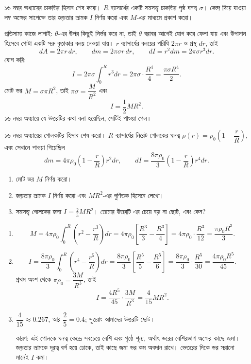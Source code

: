 \documentclass[11pt]{article}
\begin{document}
 ১৬ নম্বর অধ্যায়ের চাকতির হিসাব শেষ করো। $R$ ব্যাসার্ধের একটি
সমসত্ত্ব চাকতির পৃষ্ঠ ঘনত্ব $\sigma$। কেন্দ্র দিয়ে যাওয়া লম্ব অক্ষের সাপেক্ষে
তার জড়তার ভ্রামক $I$ নির্ণয় করো এবং $M$-এর মাধ্যমে প্রকাশ করো।

\begin{sol}
প্রতিসাম্য কাজে লাগাই: $\theta$-এর উপর কিছুই নির্ভর করে না, তাই $\theta$
বরাবর আগেই যোগ করে ফেলা যায় এবং উপাদান হিসেবে গোটা একটি সরু বৃত্তাকার বলয়
নেওয়া যায়। $r$ ব্যাসার্ধের বলয়ের পরিধি $2\pi r$ ও প্রস্থ $dr$, তাই
\[
  dA = 2\pi r\,dr, \qquad dm = 2\pi\sigma r\,dr, \qquad
  dI = r^{2}dm = 2\pi\sigma r^{3}dr .
\]
যোগ করি:
\[
  I = 2\pi\sigma\int_{0}^{R}r^{3}dr = 2\pi\sigma \cdot \frac{R^{4}}{4}
    = \frac{\pi\sigma R^{4}}{2} .
\]
মোট ভর $M = \sigma \pi R^{2}$, তাই $\pi\sigma = \dfrac{M}{R^{2}}$ এবং
\[
  I = \frac{1}{2}MR^{2} .
\]
১৬ নম্বর অধ্যায়ে যে উত্তরটির কথা বলা হয়েছিল, সেটিই পাওয়া গেল।
\end{sol}

 ১৬ নম্বর অধ্যায়ের গোলকটির হিসাব শেষ করো। $R$ ব্যাসার্ধের নিরেট
গোলকের ঘনত্ব $\rho(r) = \rho_{0}\left( 1 - \dfrac{r}{R} \right)$, এবং সেখানে
পাওয়া গিয়েছিল
\[
  dm = 4\pi\rho_{0}\left( 1-\frac{r}{R} \right)r^{2}dr, \qquad
  dI = \frac{8\pi\rho_{0}}{3}\left( 1-\frac{r}{R} \right)r^{4}dr .
\]
\begin{enumerate}
  \item মোট ভর $M$ নির্ণয় করো।
  \item জড়তার ভ্রামক $I$ নির্ণয় করো এবং $MR^{2}$-এর গুণিতক হিসেবে লেখো।
  \item সমসত্ত্ব গোলকের জন্য $I = \tfrac{2}{5}MR^{2}$। তোমার উত্তরটি এর
        চেয়ে বড় না ছোট, এবং কেন?
\end{enumerate}

\begin{sol}
\begin{enumerate}
  \item \[
          M = 4\pi\rho_{0}\int_{0}^{R}\left( r^{2} - \frac{r^{3}}{R} \right)dr
            = 4\pi\rho_{0}\left[ \frac{R^{3}}{3} - \frac{R^{3}}{4} \right]
            = 4\pi\rho_{0}\cdot\frac{R^{3}}{12}
            = \frac{\pi\rho_{0}R^{3}}{3} .
        \]
  \item \[
          I = \frac{8\pi\rho_{0}}{3}\int_{0}^{R}
              \left( r^{4} - \frac{r^{5}}{R} \right)dr
            = \frac{8\pi\rho_{0}}{3}\left[ \frac{R^{5}}{5}
              - \frac{R^{5}}{6} \right]
            = \frac{8\pi\rho_{0}}{3}\cdot\frac{R^{5}}{30}
            = \frac{4\pi\rho_{0}R^{5}}{45} .
        \]
        প্রথম অংশ থেকে $\pi\rho_{0} = \dfrac{3M}{R^{3}}$, তাই
        \[
          I = \frac{4R^{5}}{45}\cdot\frac{3M}{R^{3}} = \frac{4}{15}MR^{2} .
        \]
  \item $\dfrac{4}{15} \approx 0.267$, আর $\dfrac{2}{5} = 0.4$; সুতরাং
        আমাদের উত্তরটি ছোট।

        কারণ: এই গোলকে ঘনত্ব কেন্দ্রে সবচেয়ে বেশি এবং পৃষ্ঠে শূন্য, অর্থাৎ
        ভরের বেশিরভাগ অক্ষের কাছে জমা। জড়তার ভ্রামকে দূরত্ব বর্গ হয়ে ঢোকে,
        তাই কাছে জমা ভর কম অবদান রাখে। ভেতরের দিকে ভর সরানো মানেই $I$ কমা।
\end{enumerate}
\end{sol}
\end{document}
